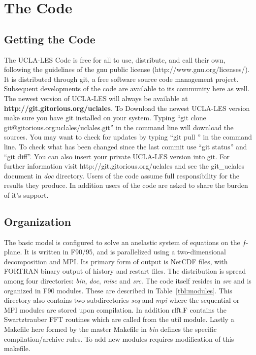 \documentclass[11pt,a4paper]{article}
\begin{document}
\section{The Code}
\subsection{Getting the Code}
The UCLA-LES Code is free for all to use, distribute, and call their own,
following the guidelines of the gnu public license (http://www.gnu.org/licenses/).
It is distributed through git, a free software source code management project.
Subsequent developments of the code are available to its community here as well.
The newest version of UCLA-LES will always be available at \textbf{http://git.gitorious.org/uclales}.
To Download the newest UCLA-LES version make sure you have git installed on your system.
Typing ``git clone git@gitorious.org:uclales/uclales.git'' in the command line
will download the sources. You may want to check for updates by typing ``git pull ''
in the command line. To check what has been changed since the last commit use
``git status'' and ``git diff''. You can also insert your private UCLA-LES version into git.
For further information visit http://git.gitorious.org/uclales and see the git\_uclales document
in \emph{doc} directory. Users of the code assume full responsibility for the results they produce.
In addition users of the code are asked to share the burden of it's support.

\subsection{Organization}

The basic model is configured to solve an anelastic system of
equations on the $f$-plane.  It is written in F90/95, and is
parallelized using a two-dimensional decomposition and MPI.  Its
primary form of output is NetCDF files, with FORTRAN binary output of
history and restart files. The distribution is spread among four
directories: \emph{bin}, \emph{doc}, \emph{misc} and \emph{src}.
The code itself resides in \emph{src} and is organized in F90 modules.
These are described in Table~\ref{tbl:modules}.
This directory also contains two subdirectories \emph{seq} and \emph{mpi}
where the sequential or MPI modules are stored upon compilation. In addition
rfft.F contains the Swartztrauber FFT routines which are called from
the util module. Lastly a Makefile here formed by the master Makefile
in \emph{bin} defines the specific compilation/archive rules.
To add new modules requires modification of this makefile.
\end{document}
